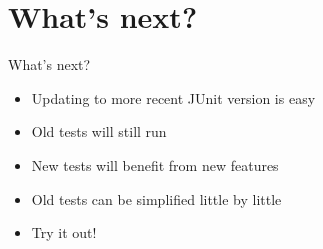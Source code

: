 {
\date{Quint Buchholz, Mann auf einer Leiter}
\part{What's next?}
}

\begin{frame}{What's next?}
	\begin{itemize}
		\item Updating to more recent JUnit version is easy
		\item Old tests will still run
		\item New tests will benefit from new features
		\item Old tests can be simplified little by little
		\item<alert@2> Try it out!
	\end{itemize}
\end{frame}

